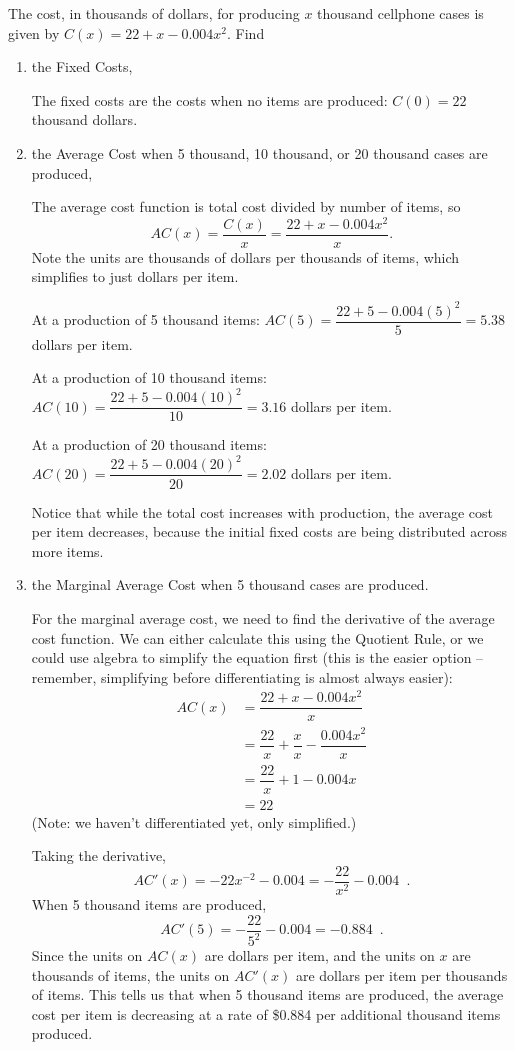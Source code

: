 \begin{example}
The cost, in thousands of dollars, for producing $x$ thousand cellphone cases is given by $C(x)=22+x-0.004x^2$. Find
    \begin{enumerate}[label=(\alph*)]
    \item the Fixed Costs,
    \begin{solution}
    The fixed costs are the costs when no items are produced: $C(0)=22$ thousand dollars.
    \end{solution}
    \item the Average Cost when 5 thousand, 10 thousand, or 20 thousand cases are produced,
    \begin{solution}
    The average cost function is total cost divided by number of items, so
$$AC(x)=\dfrac{C(x)}{x}=\dfrac{22+x-0.004x^2}{x}. $$
Note the units are thousands of dollars per thousands of items, which simplifies to just dollars per item.

At a production of 5 thousand items: $ AC(5)=\dfrac{22+5-0.004(5)^2}{5}=5.38 $ dollars per item.

At a production of 10 thousand items: $ AC(10)=\dfrac{22+5-0.004(10)^2}{10}=3.16 $ dollars per item.

At a production of 20 thousand items: $ AC(20)=\dfrac{22+5-0.004(20)^2}{20}=2.02 $ dollars per item.

Notice that while the total cost increases with production, the average cost per item decreases, because the initial fixed costs are being distributed across more items.
    \end{solution}
    \item the Marginal Average Cost when 5 thousand cases are produced.

    \begin{solution} 
    For the marginal average cost, we need to find the derivative of the average cost function. We can either calculate this using the Quotient Rule, or we could use algebra to simplify the equation first (this is the easier option -- remember, simplifying before differentiating is almost always easier):
    \begin{align*}
					AC(x) &= \dfrac{22+x-0.004x^2}{x} \\
					 &= \dfrac{22}{x}+\dfrac{x}{x}-\dfrac{0.004x^2}{x} \\
					 &= \dfrac{22}{x}+1-0.004x \\
					 &= 22
\end{align*}
(Note: we haven't differentiated yet, only simplified.)

Taking the derivative,
$$ AC'(x)=-22x^{-2}-0.004=-\dfrac{22}{x^2}-0.004 \enspace .$$
When 5 thousand items are produced,
$$ AC'(5)=-\dfrac{22}{5^2}-0.004=-0.884 \enspace .$$
Since the units on $AC(x)$ are dollars per item, and the units on $x$ are thousands of items, the units on $AC'(x)$ are dollars per item per thousands of items. This tells us that when 5 thousand items are produced, the average cost per item is decreasing at a rate of \$0.884 per additional thousand items produced.
    \end{solution}
    \end{enumerate}
\end{example}
